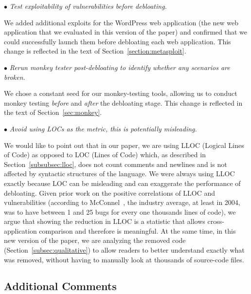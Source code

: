\vspace{1ex}

\noindent $\bullet$ \textit{Test exploitability of vulnerabilities before debloating.}
\vspace{0.5ex}

\noindent We added additional exploits for the WordPress web application (the new web application that we evaluated in this version of the paper) and confirmed that we could successfully launch them before debloating each web application. This change is reflected in the text of Section~\ref{section:metasploit}.

\vspace{1ex}

\noindent $\bullet$ \textit{Rerun monkey tester post-debloating to identify whether any scenarios are broken.}
\vspace{0.5ex}

\noindent We chose a constant seed for our monkey-testing tools, allowing us to conduct monkey testing \textit{before} and \textit{after} the debloating stage. This change is reflected in the text of Section~\ref{sec:monkey}.

\vspace{1ex}

\noindent $\bullet$ \textit{Avoid using LOCs as the metric, this is potentially misleading.}
\vspace{0.5ex}

\noindent We would like to point out that in our paper, we are using LLOC (Logical Lines of Code) as opposed to LOC (Lines of Code) which, as described in Section~\ref{subsubsec:lloc}, does not count comments and newlines and is not affected by syntactic structures of the language. We were always using LLOC exactly because LOC can be misleading and can exaggerate the performance of debloating. Given prior work on the positive correlations of LLOC and vulnerabilities (according to McConnel~\cite{mcconnell2004code}, the industry average, at least in 2004, was to have between 1 and 25 bugs for every one thousands lines of code), we argue that showing the reduction in LLOC is a statistic that allows cross-application comparison and therefore is meaningful. At the same time, in this new version of the paper, we are analyzing the removed code (Section~\ref{subsec:qualitative}) to allow readers to better understand exactly what was removed, without having to manually look at thousands of source-code files.


\subsection{Additional Comments}
\label{sec:additional-comments}

